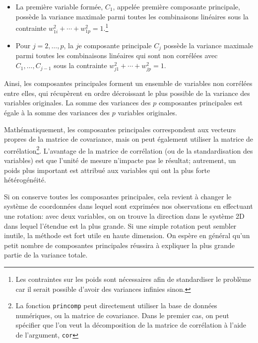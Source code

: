 \documentclass[
  11pt,
  letterpaper,
]{scrbook}
\providecommand{\tightlist}{%
  \setlength{\itemsep}{0pt}\setlength{\parskip}{0pt}}\usepackage{longtable,booktabs,array}
\theoremstyle{definition}
\theoremstyle{remark}
\begin{document}
\begin{itemize}
\tightlist
\item
  La première variable formée, \(C_1\), appelée première composante
  principale, possède la variance maximale parmi toutes les combinaisons
  linéaires sous la contrainte
  \(w_{1i}^2 + \cdots + w_{1p}^2=1\).\footnote{Les contraintes sur les
    poids sont nécessaires afin de standardiser le problème car il
    serait possible d'avoir des variances infinies sinon.}
\item
  Pour \(j=2, \ldots, p\), la \(j\)e composante principale \(C_j\)
  possède la variance maximale parmi toutes les combinaisons linéaires
  qui sont non corrélées avec \(C_1, \ldots, C_{j-1}\) sous la
  contrainte \(w_{j1}^2 + \cdots + w_{jp}^2=1\).
\end{itemize}

Ainsi, les composantes principales forment un ensemble de variables non
corrélées entre elles, qui récupèrent en ordre décroissant le plus
possible de la variance des variables originales. La somme des variances
des \(p\) composantes principales est égale à la somme des variances des
\(p\) variables originales.

Mathématiquement, les composantes principales correspondent aux vecteurs
propres de la matrice de covariance, mais on peut également utiliser la
matrice de corrélation\footnote{La fonction \texttt{princomp} peut
  directement utiliser la base de données numériques, ou la matrice de
  covariance. Dans le premier cas, on peut spécifier que l'on veut la
  décomposition de la matrice de corrélation à l'aide de l'argument,
  \texttt{cor}}. L'avantage de la matrice de corrélation (ou de la
standardisation des variables) est que l'unité de mesure n'impacte pas
le résultat; autrement, un poids plus important est attribué aux
variables qui ont la plus forte hétérogénéité.

Si on conserve toutes les composantes principales, cela revient à
changer le système de coordonnées dans lequel sont exprimées nos
observations en effectuant une rotation: avec deux variables, on on
trouve la direction dans le système 2D dans lequel l'étendue est la plus
grande. Si une simple rotation peut sembler inutile, la méthode est fort
utile en haute dimension. On espère en général qu'un petit nombre de
composantes principales réussira à expliquer la plus grande partie de la
variance totale.
\end{document}
